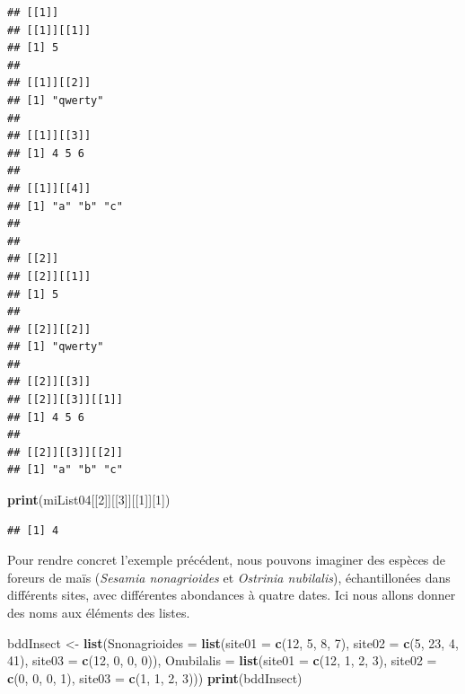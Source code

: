 \documentclass[]{book}
\newenvironment{Shaded}{\begin{snugshade}}{\end{snugshade}}
\newcommand{\KeywordTok}[1]{\textcolor[rgb]{0.13,0.29,0.53}{\textbf{#1}}}
\newcommand{\DataTypeTok}[1]{\textcolor[rgb]{0.13,0.29,0.53}{#1}}
\newcommand{\DecValTok}[1]{\textcolor[rgb]{0.00,0.00,0.81}{#1}}
\newcommand{\StringTok}[1]{\textcolor[rgb]{0.31,0.60,0.02}{#1}}
\newcommand{\NormalTok}[1]{#1}
\begin{document}
\begin{verbatim}
## [[1]]
## [[1]][[1]]
## [1] 5
## 
## [[1]][[2]]
## [1] "qwerty"
## 
## [[1]][[3]]
## [1] 4 5 6
## 
## [[1]][[4]]
## [1] "a" "b" "c"
## 
## 
## [[2]]
## [[2]][[1]]
## [1] 5
## 
## [[2]][[2]]
## [1] "qwerty"
## 
## [[2]][[3]]
## [[2]][[3]][[1]]
## [1] 4 5 6
## 
## [[2]][[3]][[2]]
## [1] "a" "b" "c"
\end{verbatim}

\begin{Shaded}
\begin{Highlighting}[]
\KeywordTok{print}\NormalTok{(miList04[[}\DecValTok{2}\NormalTok{]][[}\DecValTok{3}\NormalTok{]][[}\DecValTok{1}\NormalTok{]][}\DecValTok{1}\NormalTok{])}
\end{Highlighting}
\end{Shaded}

\begin{verbatim}
## [1] 4
\end{verbatim}

Pour rendre concret l'exemple précédent, nous pouvons imaginer des
espèces de foreurs de maïs (\emph{Sesamia nonagrioides} et
\emph{Ostrinia nubilalis}), échantillonées dans différents sites, avec
différentes abondances à quatre dates. Ici nous allons donner des noms
aux éléments des listes.

\begin{Shaded}
\begin{Highlighting}[]
\NormalTok{bddInsect <-}\StringTok{ }\KeywordTok{list}\NormalTok{(}\DataTypeTok{Snonagrioides =} \KeywordTok{list}\NormalTok{(}\DataTypeTok{site01 =} \KeywordTok{c}\NormalTok{(}\DecValTok{12}\NormalTok{, }\DecValTok{5}\NormalTok{, }\DecValTok{8}\NormalTok{, }\DecValTok{7}\NormalTok{), }\DataTypeTok{site02 =} \KeywordTok{c}\NormalTok{(}\DecValTok{5}\NormalTok{, }\DecValTok{23}\NormalTok{, }\DecValTok{4}\NormalTok{, }\DecValTok{41}\NormalTok{), }\DataTypeTok{site03 =} \KeywordTok{c}\NormalTok{(}\DecValTok{12}\NormalTok{, }\DecValTok{0}\NormalTok{, }\DecValTok{0}\NormalTok{, }\DecValTok{0}\NormalTok{)), }\DataTypeTok{Onubilalis =} \KeywordTok{list}\NormalTok{(}\DataTypeTok{site01 =} \KeywordTok{c}\NormalTok{(}\DecValTok{12}\NormalTok{, }\DecValTok{1}\NormalTok{, }\DecValTok{2}\NormalTok{, }\DecValTok{3}\NormalTok{), }\DataTypeTok{site02 =} \KeywordTok{c}\NormalTok{(}\DecValTok{0}\NormalTok{, }\DecValTok{0}\NormalTok{, }\DecValTok{0}\NormalTok{, }\DecValTok{1}\NormalTok{), }\DataTypeTok{site03 =} \KeywordTok{c}\NormalTok{(}\DecValTok{1}\NormalTok{, }\DecValTok{1}\NormalTok{, }\DecValTok{2}\NormalTok{, }\DecValTok{3}\NormalTok{)))}
\KeywordTok{print}\NormalTok{(bddInsect)}
\end{Highlighting}
\end{Shaded}
\end{document}
